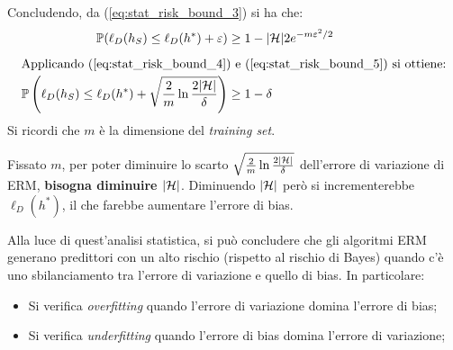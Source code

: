 Concludendo, da (\ref{eq:stat_risk_bound_3}) si ha che:
\begin{align}
\Prob(\ell_D(h_S)\leq\ell_D(h^*)+\varepsilon) &\geq 1-|\Hpred|2e^{-m\varepsilon^2/2}\notag\\[.2cm]
\multispan2{Applicando (\ref{eq:stat_risk_bound_4}) e (\ref{eq:stat_risk_bound_5})
si ottiene:\hfill}\notag\\
\Prob\left(\ell_D(h_S)\leq\ell_D(h^*)+\sqrt{\frac{2}{m}\ln{\frac{2|\Hpred|}{\delta}}}\right) 
    &\geq 1-\delta\notag
\end{align}
Si ricordi che $m$ è la dimensione del \textit{training set}.

Fissato $m$, per poter diminuire lo scarto 
$\sqrt{\frac{2}{m}\ln{\frac{2|\ensuremath{\mathcal{H}}|}{\delta}}}$ dell'errore di variazione di 
ERM, \textbf{bisogna diminuire $|\mathcal{H}|$}. Diminuendo $|\mathcal{H}|$ però si
incrementerebbe $\ell_D(h^*)$, il che farebbe aumentare l'errore di bias.

Alla luce di quest'analisi statistica, si può concludere che gli algoritmi ERM
generano predittori con un alto rischio (rispetto al rischio di Bayes) quando
c'è uno sbilanciamento tra l'errore di variazione e quello di bias.
In particolare:
\begin{itemize}
    \item Si verifica \textit{overfitting} quando l'errore di variazione domina
        l'errore di bias;
    \item Si verifica \textit{underfitting} quando l'errore di bias domina
        l'errore di variazione;
\end{itemize}